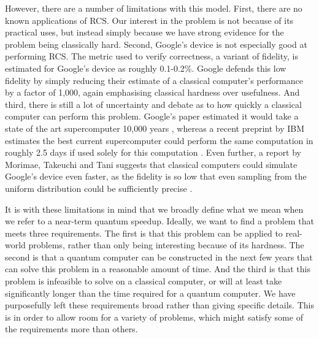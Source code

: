 However, there are a number of limitations with this model. First, there are no known applications of RCS. Our interest in the problem is not because of its practical uses, but instead simply because we have strong evidence for the problem being classically hard. Second, Google's device is not especially good at performing RCS. The metric used to verify correctness, a variant of fidelity, is estimated for Google's device as roughly 0.1-0.2\%. Google defends this low fidelity by simply reducing their estimate of a classical computer's performance by a factor of 1,000, again emphasising classical hardness over usefulness. And third, there is still a lot of uncertainty and debate as to how quickly a classical computer can perform this problem. Google's paper estimated it would take a state of the art supercomputer 10,000 years \cite{arute2019}, whereas a recent preprint by IBM estimates the best current supercomputer could perform the same computation in roughly 2.5 days if used solely for this computation \cite{pednault2019}. Even further, a report by Morimae, Takeuchi and Tani suggests that classical computers could simulate Google's device even faster, as the fidelity is so low that even sampling from the uniform distribution could be sufficiently precise \cite{morimae2019google}.

It is with these limitations in mind that we broadly define what we mean when we refer to a near-term quantum speedup. Ideally, we want to find a problem that meets three requirements. The first is that this problem can be applied to real-world problems, rather than only being interesting because of its hardness. The second is that a quantum computer can be constructed in the next few years that can solve this problem in a reasonable amount of time. And the third is that this problem is infeasible to solve on a classical computer, or will at least take significantly longer than the time required for a quantum computer. We have purposefully left these requirements broad rather than giving specific details. This is in order to allow room for a variety of problems, which might satisfy some of the requirements more than others.

